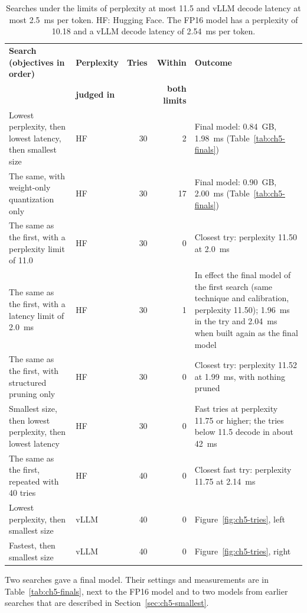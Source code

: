 \documentclass[
11pt, %
english, %
singlespacing, %
headsepline, %
]{MastersDoctoralThesis} %
\begin{document}
\begin{table}[htbp]
\centering
\footnotesize
\caption{Searches under the limits of perplexity at most 11.5 and vLLM decode latency at most 2.5~ms per token. HF: Hugging Face. The FP16 model has a perplexity of 10.18 and a vLLM decode latency of 2.54~ms per token.}
\label{tab:ch5-searches}
\renewcommand{\arraystretch}{1.2}
\begin{tabularx}{\textwidth}{>{\raggedright\arraybackslash}p{4.3cm}lrr>{\raggedright\arraybackslash}X}
\hline
\textbf{Search (objectives in order)} & \textbf{Perplexity} & \textbf{Tries} & \textbf{Within} & \textbf{Outcome} \\
 & \textbf{judged in} & & \textbf{both limits} & \\
\hline
Lowest perplexity, then lowest latency, then smallest size & HF & 30 & 2 & Final model: 0.84~GB, 1.98~ms (Table~\ref{tab:ch5-finals}) \\
The same, with weight-only quantization only & HF & 30 & 17 & Final model: 0.90~GB, 2.00~ms (Table~\ref{tab:ch5-finals}) \\
The same as the first, with a perplexity limit of 11.0 & HF & 30 & 0 & Closest try: perplexity 11.50 at 2.0~ms \\
The same as the first, with a latency limit of 2.0~ms & HF & 30 & 1 & In effect the final model of the first search (same technique and calibration, perplexity 11.50); 1.96~ms in the try and 2.04~ms when built again as the final model \\
The same as the first, with structured pruning only & HF & 30 & 0 & Closest try: perplexity 11.52 at 1.99~ms, with nothing pruned \\
Smallest size, then lowest perplexity, then lowest latency & HF & 30 & 0 & Fast tries at perplexity 11.75 or higher; the tries below 11.5 decode in about 42~ms \\
The same as the first, repeated with 40 tries & HF & 40 & 0 & Closest fast try: perplexity 11.75 at 2.14~ms \\
Lowest perplexity, then smallest size & vLLM & 40 & 0 & Figure~\ref{fig:ch5-tries}, left \\
Fastest, then smallest size & vLLM & 40 & 0 & Figure~\ref{fig:ch5-tries}, right \\
\hline
\end{tabularx}
\end{table}

Two searches gave a final model. Their settings and measurements are in Table~\ref{tab:ch5-finals}, next to the FP16 model and to two models from earlier searches that are described in Section~\ref{sec:ch5-smallest}.
\end{document}
